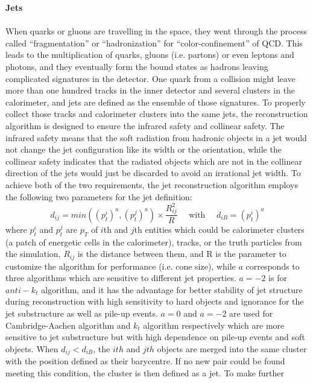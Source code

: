 \noindent
{\bf Jets}
\\
\\When quarks or gluons are travelling in the space, they went through the process called ``fragmentation'' or ``hadronization'' for ``color-confinement'' of QCD. This leads to the multiplication of quarks, gluons (i.e. partons) or even leptons and photons, and they eventually form the bound states as hadrons leaving complicated signatures in the detector. One quark from a collision might leave more than one hundred tracks in the inner detector and several clusters in the calorimeter, and jets are defined as the ensemble of those signatures. To properly collect those tracks and calorimeter clusters into the same jets, the reconstruction algorithm is designed to ensure the infrared safety and collinear safety. The infrared safety means that the soft radiation from hadronic objects in a jet would not change the jet configuration like its width or the orientation, while the collinear safety indicates that the radiated objects which are not in the collinear direction of the jets would just be discarded to avoid an irrational jet width. To achieve both of the two requirements, the jet reconstruction algorithm employs the following two parameters for the jet definition: 
\begin{equation}
d_{ij}=min((p_{t}^{i})^{a},(p_{t}^{j})^{a})\times \frac{R_{ij}^{2}}{R}
\quad \text{ with } \quad
d_{iB}=(p_{t}^{i})^{a}
\end{equation}
where $p_{t}^{i}$ and $p_{t}^{j}$ are $p_{T}$ of $i$th and $j$th entities which could be calorimeter clusters (a patch of energetic cells in the calorimeter), tracks, or the truth particles from the simulation, $R_{ij}$ is the distance between them, and R is the parameter to customize the algorithm for performance (i.e. cone size), while $a$ corresponds to three algorithms which are sensitive to different jet properties. $a=-2$ is for $anti-k_{t}$ algorithm, and it has the advantage for better stability of jet structure during reconstruction with high sensitivity to hard objects and ignorance for the jet substructure as well as pile-up events. $a=0$ and $a=-2$ are used for Cambridge-Aachen algorithm and $k_{t}$ algorithm respectively which are more sensitive to jet substructure but with high dependence on pile-up events and soft objects. When $d_{ij}<d_{iB}$, the $ith$ and $jth$ objects are merged into the same cluster with the position defined as their barycentre. If no new pair could be found meeting this condition, the cluster is then defined as a jet. To make further 
